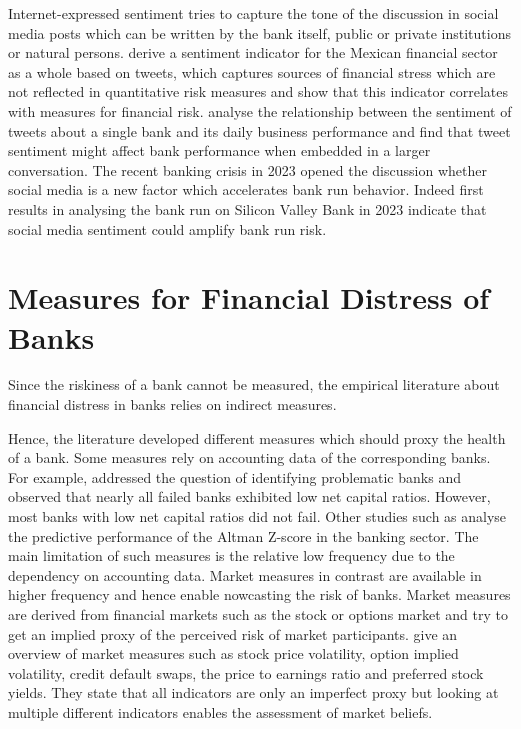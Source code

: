  Internet-expressed sentiment tries to capture the tone of the discussion in social media posts which can be written by the bank itself, public or private institutions or natural persons. \cite{fernandez2021} derive a sentiment indicator for the Mexican financial sector as a whole based on tweets, which captures sources of financial stress which are not reflected in quantitative risk measures and show that this indicator correlates with measures for financial risk. \cite{illia2021} analyse the relationship between the sentiment of tweets about a single bank and its daily business performance and find that tweet sentiment might affect bank performance when embedded in a larger conversation. The recent banking crisis in 2023 opened the discussion whether social media is a new factor which accelerates bank run behavior. Indeed first results in \cite{cookson2023} analysing the bank run on Silicon Valley Bank in 2023 indicate that social media sentiment could amplify bank run risk.

\section{Measures for Financial Distress of Banks}



Since the riskiness of a bank cannot be measured, the empirical literature about financial distress in banks relies on indirect measures.



Hence, the literature developed different measures which should proxy the health of a bank. Some measures rely on accounting data of the corresponding banks. For example, \cite{sinkey1978} addressed the question of identifying problematic banks and observed that nearly all failed banks exhibited low net capital ratios. However, most banks with low net capital ratios did not fail. Other studies such as \cite{chiaramonte2016} analyse the predictive performance of the Altman Z-score in the banking sector. The main limitation of such measures is the relative low frequency due to the dependency on accounting data. Market measures in contrast are available in higher frequency and hence enable nowcasting the risk of banks. Market measures are derived from financial markets such as the stock or options market and try to get an implied proxy of the perceived risk of market participants. \cite{sarin2016} give an overview of market measures such as stock price volatility, option implied volatility, credit default swaps, the price to earnings ratio and preferred stock yields. They state that all indicators are only an imperfect proxy but looking at multiple different indicators enables the assessment of market beliefs.

